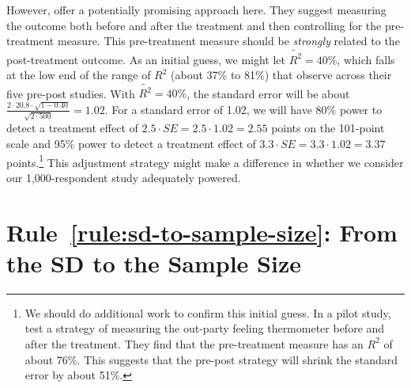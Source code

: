 \documentclass[12pt]{article}
\begin{document}
However, \citet{Clifford2021} offer a potentially promising approach here.
They suggest measuring the outcome both before and after the treatment and then controlling for the pre-treatment measure.
This pre-treatment measure should be \emph{strongly} related to the post-treatment outcome.
As an initial guess, we might let $\widetilde{R^{2}} = 40\%$, which falls at the low end of the range of $R^{2}$ (about 37\% to 81\%) that \citet[1059]{Clifford2021} observe across their five pre-post studies.
With $\widetilde{R^{2}} = 40\%$, the standard error will be about $\frac{2 \cdot 20.8 \cdot \sqrt{1 - 0.40}}{\sqrt{2 \cdot 500}} = 1.02$.
For a standard error of 1.02, we will have 80\% power to detect a treatment effect of $2.5 \cdot SE = 2.5 \cdot 1.02 = 2.55$ points on the 101-point scale and 95\% power to detect a treatment effect of $3.3 \cdot SE = 3.3 \cdot 1.02 = 3.37$ points.\footnote{
  We should do additional work to confirm this initial guess.
  In a pilot study, \citet{Cutler2024} test a strategy of measuring the out-party feeling thermometer before and after the treatment.
  They find that the pre-treatment measure has an $R^{2}$ of about 76\%.
  This suggests that the pre-post strategy will shrink the standard error by about 51\%.}
This adjustment strategy might make a difference in whether we consider our 1,000-respondent study adequately powered.

\section*{Rule~\ref{rule:sd-to-sample-size}: From the SD to the Sample Size}
\end{document}
